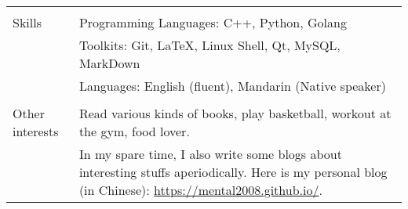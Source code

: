 \documentclass[letterpaper, 11pt]{article}
\begin{document}
\begin{longtable}{p{1.3in}p{4.8in}}
& \\

{Skills}
& Programming Languages: C++, Python, Golang \\
& Toolkits: Git, \LaTeX, Linux Shell, Qt, MySQL, MarkDown \\
& Languages: English (fluent), Mandarin (Native speaker) \\
& \\


\nohyphens{Other interests}
& Read various kinds of books, play basketball, workout at the gym, food lover. \\
& In my spare time, I also write some blogs about interesting stuffs aperiodically. Here is my personal blog (in Chinese): \href{https://mental2008.github.io/}{https://mental2008.github.io/}. \\


\end{longtable}
\end{document}
